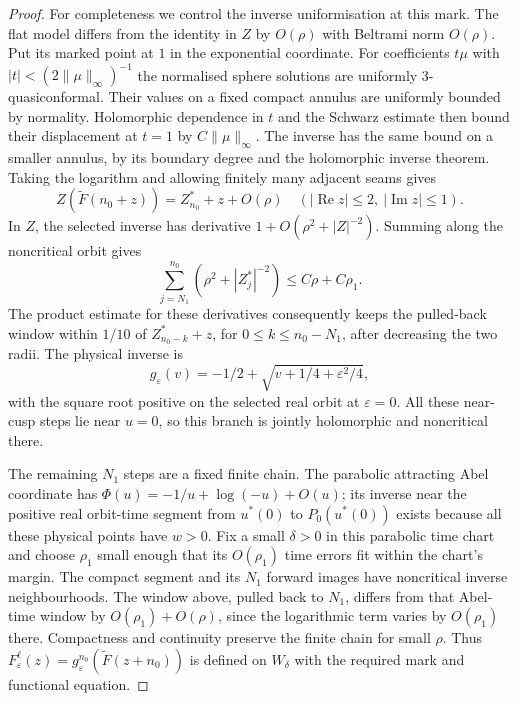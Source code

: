 \documentclass[11pt]{article}
\newcommand{\re}{\operatorname{Re}}
\newcommand{\im}{\operatorname{Im}}
\begin{document}
\begin{proof}
For completeness we control the inverse uniformisation at this mark.
The flat model differs from the identity in $Z$ by $O(\rho)$ with
Beltrami norm $O(\rho)$. Put its marked point at $1$ in the exponential
coordinate. For coefficients $t\mu$ with
$|t|<(2\|\mu\|_\infty)^{-1}$ the normalised sphere solutions are
uniformly 3-quasiconformal. Their values on a fixed compact annulus
are uniformly bounded by normality. Holomorphic dependence in $t$
and the Schwarz estimate then bound their displacement at $t=1$ by
$C\|\mu\|_\infty$. The inverse has the same bound on a smaller
annulus, by its boundary degree and the holomorphic inverse theorem.
Taking the logarithm and allowing finitely many adjacent seams gives
\[
 Z(\widetilde F(n_0+z))=Z_{n_0}^*+z+O(\rho)
 \quad (|\re z|\le2,\ |\im z|\le1).
\]
In $Z$, the selected inverse has derivative
$1+O(\rho^2+|Z|^{-2})$. Summing along the noncritical orbit gives
\[
 \sum_{j=N_1}^{n_0}(\rho^2+|Z_j^*|^{-2})\le C\rho+C\rho_1.
\]
The product estimate for these derivatives consequently keeps the
pulled-back window within $1/10$ of $Z_{n_0-k}^*+z$, for
$0\le k\le n_0-N_1$, after decreasing the two radii.
The physical inverse is
\[
 g_\varepsilon(v)=-1/2+\sqrt{v+1/4+\varepsilon^2/4},
\]
with the square root positive on the selected real orbit at
$\varepsilon=0$. All these near-cusp steps lie near $u=0$, so this
branch is jointly holomorphic and noncritical there.

The remaining $N_1$ steps are a fixed finite chain. The parabolic
attracting Abel coordinate has
$\Phi(u)=-1/u+\log(-u)+O(u)$; its inverse near the positive real
orbit-time segment from $u^*(0)$ to $P_0(u^*(0))$ exists because
all these physical points have $w>0$. Fix a small $\delta>0$ in this
parabolic time chart and choose $\rho_1$ small enough that its $O(\rho_1)$
time errors fit within the chart's margin. The compact segment and its
$N_1$ forward images have noncritical inverse neighbourhoods. The window
above, pulled back to $N_1$, differs from that Abel-time window by
$O(\rho_1)+O(\rho)$, since the logarithmic term varies by $O(\rho_1)$
there. Compactness and continuity preserve the finite chain for small
$\rho$. Thus
$F^\ell_\varepsilon(z)=g_\varepsilon^{n_0}
 (\widetilde F(z+n_0))$ is defined on $W_\delta$ with the required
mark and functional equation.


\end{proof}
\end{document}
